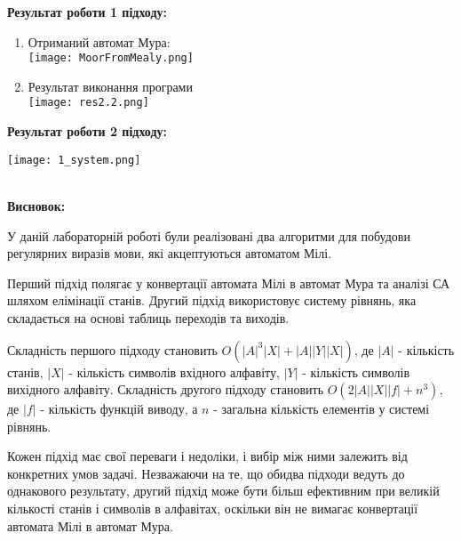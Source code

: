 \documentclass[12pt,a4paper]{article}
\begin{document}
\textbf{Результат роботи 1 підходу:}

\begin{enumerate}
    \item Отриманий автомат Мура: \\
    \texttt{[image: MoorFromMealy.png]}
    \item Результат виконання програми \\
    \texttt{[image: res2.2.png]}
\end{enumerate}

\textbf{Результат роботи 2 підходу:}

\texttt{[image: 1\_system.png]}

\\

\vspace{1em}
\textbf{Висновок:}
\vspace{0.5em}

У даній лабораторній роботі були реалізовані два алгоритми для побудови регулярних виразів мови, які акцептуються автоматом Мілі.

Перший підхід полягає у конвертації автомата Мілі в автомат Мура та аналізі СА шляхом елімінації станів. Другий підхід використовує систему рівнянь, яка складається на основі таблиць переходів та виходів.

Складність першого підходу становить \(O(|A|^3|X| + |A||Y||X|)\), де \(|A|\) - кількість станів, \(|X|\) - кількість символів вхідного алфавіту, \(|Y|\) - кількість символів вихідного алфавіту. Складність другого підходу становить \(O(2|A||X||f| + n^3)\), де \(|f|\) - кількість функцій виводу, а \(n\) - загальна кількість елементів у системі рівнянь.

Кожен підхід має свої переваги і недоліки, і вибір між ними залежить від конкретних умов задачі. Незважаючи на те, що обидва підходи ведуть до однакового результату, другий підхід може бути більш ефективним при великій кількості станів і символів в алфавітах, оскільки він не вимагає конвертації автомата Мілі в автомат Мура.
\end{document}
